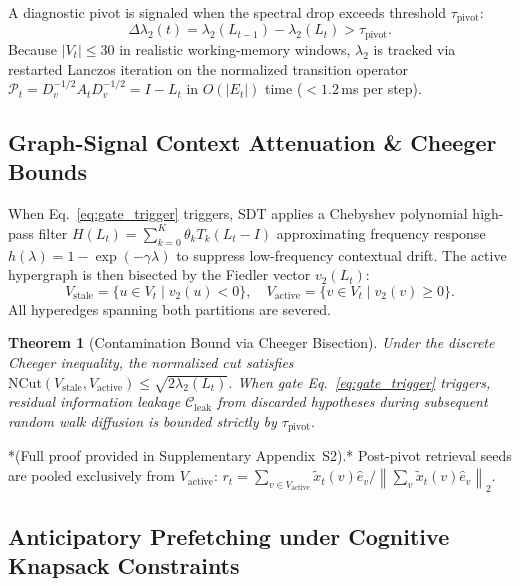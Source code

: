 \documentclass[12pt]{article}
\newtheorem{theorem}{Theorem}
\newcommand{\norm}[1]{\left\lVert#1\right\rVert}
\begin{document}
A diagnostic pivot is signaled when the spectral drop exceeds threshold $\tau_{\text{pivot}}$:
\begin{equation}
  \Delta \lambda_2(t) = \lambda_2(L_{t-1}) - \lambda_2(L_t) > \tau_{\text{pivot}}.
  \label{eq:gate_trigger}
\end{equation}
Because $|V_t| \le 30$ in realistic working-memory windows, $\lambda_2$ is tracked via restarted Lanczos iteration on the normalized transition operator $\mathcal{P}_t = D_v^{-1/2} A_t D_v^{-1/2} = I - L_t$ in $O(|E_t|)$ time ($< 1.2$\,ms per step).

\subsection*{Graph-Signal Context Attenuation \& Cheeger Bounds}

When Eq.~\eqref{eq:gate_trigger} triggers, SDT applies a Chebyshev polynomial high-pass filter $H(L_t) = \sum_{k=0}^K \theta_k T_k(L_t - I)$ approximating frequency response $h(\lambda) = 1 - \exp(-\gamma \lambda)$ to suppress low-frequency contextual drift. The active hypergraph is then bisected by the Fiedler vector $v_2(L_t)$:
\begin{equation}
  V_{\text{stale}} = \{u \in V_t \mid v_2(u) < 0\}, \quad V_{\text{active}} = \{v \in V_t \mid v_2(v) \ge 0\}.
\end{equation}
All hyperedges spanning both partitions are severed.

\begin{theorem}[Contamination Bound via Cheeger Bisection]
\label{thm:cheeger_bound}
Under the discrete Cheeger inequality, the normalized cut satisfies $\mathrm{NCut}(V_{\text{stale}}, V_{\text{active}}) \le \sqrt{2 \lambda_2(L_t)}$. When gate Eq.~\eqref{eq:gate_trigger} triggers, residual information leakage $\mathcal{C}_{\text{leak}}$ from discarded hypotheses during subsequent random walk diffusion is bounded strictly by $\tau_{\text{pivot}}$.
\end{theorem}
\noindent
*(Full proof provided in Supplementary Appendix~S2).* Post-pivot retrieval seeds are pooled exclusively from $V_{\text{active}}$: $r_t = \sum_{v \in V_{\text{active}}} \tilde{x}_t(v) \hat{e}_v / \norm{\sum_{v} \tilde{x}_t(v) \hat{e}_v}_2$.

\subsection*{Anticipatory Prefetching under Cognitive Knapsack Constraints}
\end{document}
